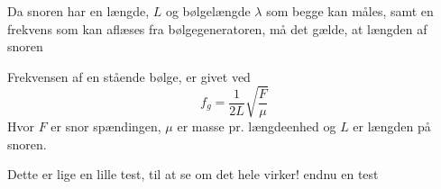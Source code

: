 \documentclass[A2_main.tex]{subfiles}
\begin{document}
Da snoren har en længde, $L$ og bølgelængde $\lambda$ som begge kan måles, samt en frekvens som kan aflæses fra bølgegeneratoren, må det gælde, at længden af snoren


Frekvensen af en stående bølge, er givet ved
\begin{equation}
 f_g = \frac{1}{2L}\sqrt{\frac{F}{\mu}}
 \label{eq: swave}
\end{equation}
Hvor $F$ er snor spændingen, $\mu$ er masse pr. længdeenhed og $L$ er længden på snoren.

Dette er lige en lille test, til at se om det hele virker!
endnu en test
\end{document}
